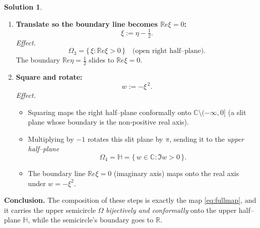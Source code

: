 \documentclass[12pt]{article}
\theoremstyle{definition} %
\newtheorem{solution}{Solution}
\theoremstyle{plain} %
\begin{document}
\begin{solution}
\begin{enumerate}[label=\textbf{Step~\arabic*.},wide,labelwidth=!,labelindent=0pt]
  \item \textbf{Translate so the boundary line becomes $\mathbb{R}e\xi=0$:}
        \[
           \xi := \eta - \tfrac12.
        \]
        \emph{Effect.}
        \[
           \Omega_3
           = \{\,\xi : \mathbb{R}e\xi>0\,\}
           \quad\text{(open right half–plane).}
        \]
        The boundary $\mathbb{R}e\eta=\tfrac12$ slides to $\mathbb{R}e\xi=0$.
  
  \item \textbf{Square and rotate:}
        \[
           w := -\xi^{\,2}.
        \]
        \emph{Effect.}
        \begin{itemize}
          \item Squaring maps the right half–plane conformally onto
                $\mathbb{C}\setminus(-\infty,0]$ (a slit plane whose boundary is
                the non‑positive real axis).
          \item Multiplying by $-1$ rotates this slit plane by $\pi$,
                sending it to the \emph{upper half–plane}
                \[
                   \Omega_4
                   = \mathbb{H}
                   = \{\,w\in\mathbb{C} : \Im w>0\,\}.
                \]
          \item The boundary line $\mathbb{R}e\xi=0$ (imaginary axis) maps onto
                the real axis under $w=-\xi^{2}$.
        \end{itemize}
  \end{enumerate}
  
  \bigskip
  \textbf{Conclusion.}
  The composition of these steps is exactly the map
  \eqref{eq:fullmap}, and it carries the upper semicircle $\Omega$
  \emph{bijectively and conformally} onto the upper half–plane
  $\mathbb{H}$, while the semicircle’s boundary goes to $\mathbb{R}$.
  \end{solution}
\end{document}
